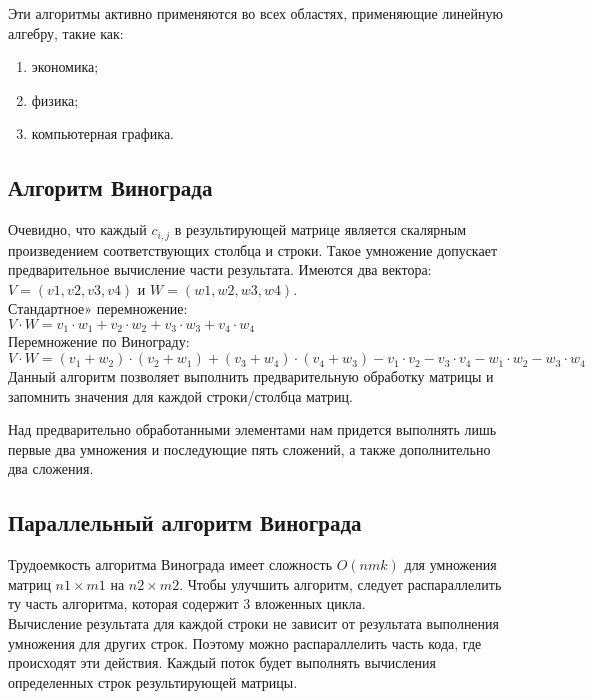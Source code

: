 \documentclass[a4paper, 14pt]{article}
\begin{document}
Эти алгоритмы активно применяются во всех областях, применяющие линейную алгебру, такие как:
\begin{enumerate}
	\item экономика;
	\item физика;
	\item компьютерная графика.
\end{enumerate}

	\newpage
	\subsection{Алгоритм Винограда}
	
	Очевидно, что каждый $c_{i,j}$ в результирующей матрице является скалярным произведением соответствующих столбца и строки. Такое умножение допускает предварительное вычисление части результата.
Имеются два вектора: $V = (v1, v2, v3, v4)$  и $W = (w1, w2, w3, w4)$.\\

Стандартное» перемножение:\\
$ V \cdot W=v_1 \cdot w_1 + v_2 \cdot w_2 + v_3 \cdot w_3 + v_4 \cdot w_4$ \\

Перемножение по Винограду:\\
$V \cdot W=(v_1 + w_2) \cdot (v_2 + w_1) + (v_3 + w_4) \cdot (v_4 + w_3) - v_1 \cdot v_2 - v_3 \cdot v_4 - w_1 \cdot w_2 - w_3 \cdot w_4$\\

	Данный алгоритм позволяет выполнить предварительную обработку матрицы и запомнить значения для каждой строки/столбца матриц. 
	
	Над предварительно обработанными элементами нам придется выполнять лишь первые два умножения и последующие пять сложений, а также дополнительно два сложения. 
	
	\subsection{Параллельный алгоритм Винограда}
	
	Трудоемкость алгоритма Винограда имеет сложность $O(nmk)$ для умножения матриц $n1 \times m1$ на $n2 \times m2$. Чтобы улучшить алгоритм, следует распараллелить ту часть алгоритма, которая содержит 3 вложенных цикла.\\

	Вычисление результата для каждой строки не зависит от результата выполнения умножения для других строк. Поэтому можно распараллелить часть кода, где происходят эти действия. Каждый поток будет выполнять вычисления определенных строк результирующей матрицы.
	
\end{document}
